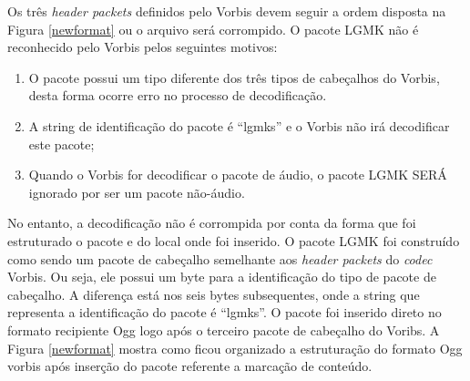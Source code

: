 Os três \textit{header packets} definidos pelo Vorbis devem seguir a ordem disposta na Figura \ref{newformat} ou o arquivo será corrompido. O pacote LGMK não é reconhecido pelo Vorbis pelos seguintes motivos:

\begin{enumerate}
	\item O pacote possui um tipo diferente dos três tipos de cabeçalhos do Vorbis, desta forma ocorre erro no processo de decodificação.
	\item A string de identificação do pacote é ``lgmks'' e o Vorbis não irá decodificar este pacote;
	\item Quando o Vorbis for decodificar o pacote de áudio, o pacote LGMK SERÁ ignorado por ser um pacote não-áudio.
\end{enumerate}

 No entanto, a decodificação não é corrompida por conta da forma que foi estruturado o pacote e do local onde foi inserido. O pacote LGMK foi construído como sendo um pacote de cabeçalho semelhante aos \textit{header packets} do \textit{codec} Vorbis. Ou seja, ele possui um byte para a identificação do tipo de pacote de cabeçalho. A diferença está nos seis bytes subsequentes, onde a string que representa a identificação do pacote é ``lgmks''. O pacote foi inserido direto no formato recipiente Ogg logo após o terceiro pacote de cabeçalho do Voribs. A Figura \ref{newformat} mostra como ficou organizado a estruturação do formato Ogg vorbis após inserção do pacote referente a marcação de conteúdo.

